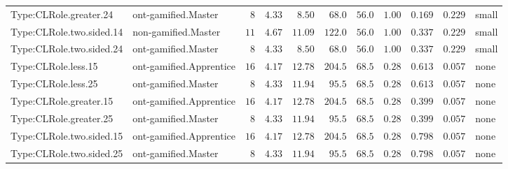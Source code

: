 \documentclass[6pt,a4paper]{article}
\begin{document}
{\begin{longtable}{llrrrrrrrrl}
Type:CLRole.greater.24&ont-gamified.Master&$ 8$&$4.33$&$ 8.50$&$  68.0$&$ 56.0$&$ 1.00$&$0.169$&$0.229$&small\tabularnewline
Type:CLRole.two.sided.14&non-gamified.Master&$11$&$4.67$&$11.09$&$ 122.0$&$ 56.0$&$ 1.00$&$0.337$&$0.229$&small\tabularnewline
Type:CLRole.two.sided.24&ont-gamified.Master&$ 8$&$4.33$&$ 8.50$&$  68.0$&$ 56.0$&$ 1.00$&$0.337$&$0.229$&small\tabularnewline
Type:CLRole.less.15&ont-gamified.Apprentice&$16$&$4.17$&$12.78$&$ 204.5$&$ 68.5$&$ 0.28$&$0.613$&$0.057$&none\tabularnewline
Type:CLRole.less.25&ont-gamified.Master&$ 8$&$4.33$&$11.94$&$  95.5$&$ 68.5$&$ 0.28$&$0.613$&$0.057$&none\tabularnewline
Type:CLRole.greater.15&ont-gamified.Apprentice&$16$&$4.17$&$12.78$&$ 204.5$&$ 68.5$&$ 0.28$&$0.399$&$0.057$&none\tabularnewline
Type:CLRole.greater.25&ont-gamified.Master&$ 8$&$4.33$&$11.94$&$  95.5$&$ 68.5$&$ 0.28$&$0.399$&$0.057$&none\tabularnewline
\newpage
Type:CLRole.two.sided.15&ont-gamified.Apprentice&$16$&$4.17$&$12.78$&$ 204.5$&$ 68.5$&$ 0.28$&$0.798$&$0.057$&none\tabularnewline
Type:CLRole.two.sided.25&ont-gamified.Master&$ 8$&$4.33$&$11.94$&$  95.5$&$ 68.5$&$ 0.28$&$0.798$&$0.057$&none\tabularnewline
\hline
\end{longtable}}
\end{document}
